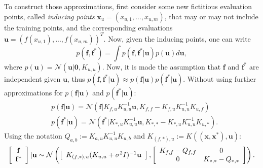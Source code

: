 To construct those approximations, first consider some new fictitious evaluation points, called \textit{inducing points} $\mathbf{x}_u = (x_{u,1},\ldots,x_{u,m})$, that may or may not include the training points, and the corresponding evaluations $\mathbf{u} = (f(x_{u,1}),...,f(x_{u,m}))^T$. Now, given the inducing points, one can write 
\begin{equation}
p(\mathbf{f},\mathbf{f}^*) = \int p(\mathbf{f},\mathbf{f}^*|\mathbf{u}) p(\mathbf{u}) d \mathbf{u},
\end{equation}
where $p(\mathbf{u}) = \mathcal{N}(\mathbf{u}|\mathbf{0},K_{u,u})$. Now, it is made the assumption that $\mathbf{f}$ and $\mathbf{f}^*$ are independent given $\mathbf{u}$, thus $p(\mathbf{f},\mathbf{f}^*|\mathbf{u}) \approx p(\mathbf{f}|\mathbf{u})p(\mathbf{f^*}|\mathbf{u})$. Without using further approximations for $p(\mathbf{f}|\mathbf{u})$ and $p(\mathbf{f^*}|\mathbf{u})$:
\begin{equation}
\begin{split}
& p(\mathbf{f}|\mathbf{u}) = \mathcal{N}(\mathbf{f}|K_{f,u} K_{u,u}^{-1} \mathbf{u}, K_{f,f} - K_{f,u} K_{u,u}^{-1} K_{u,f}) \\
& p(\mathbf{f}^{*}|\mathbf{u}) = \mathcal{N}(\mathbf{f}^{*}|K_{*,u} K_{u,u}^{-1} \mathbf{u}, K_{*,*} - K_{*,u} K_{u,u}^{-1} K_{u,*}).
\end{split}
\end{equation}
Using the notation $Q_{a,b} := K_{a,u} K_{u,u}^{-1} K_{u,b}$ and $K_{(f,*),u} := K((\mathbf{x},\mathbf{x}^*),\mathbf{u})$:
\begin{equation}
\left[ \begin{array}{c} 
\mathbf{f} \\

\mathbf{f^*} \end{array} \right] | \mathbf{u} \sim \mathcal{N} 
\left( \left[ \begin{array}{c}
K_{(f,*),u} (K_{u,u}+\sigma^2 I)^{-1} \mathbf{u} \end{array} \right] , 
\left[ \begin{array}{c c} 
K_{f,f} - Q_{f,f} & 0 \\
0 & K_{*,*} - Q_{*,*} \end{array} \right]
\right).
\end{equation}

